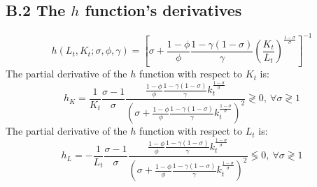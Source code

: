 \subsection*{B.2 The $h$ function's derivatives}

\begin{equation*}
	h(L_t, K_t; \sigma, \phi, \gamma) = \left[ \sigma + \frac{1-\phi}{\phi} \frac{1-\gamma(1-\sigma)}{\gamma} \left(\frac{K_t}{L_t}\right)^{\frac{1-\sigma}{\sigma}} \right]^{-1}
\end{equation*}
The partial derivative of the $h$ function with respect to $K_t$ is:
\begin{equation*}
	h_K = \frac{1}{K_t}\frac{\sigma-1}{\sigma}\frac{\frac{1-\phi}{\phi}\frac{1-\gamma(1-\sigma)}{\gamma}k_t^{\frac{1-\sigma}{\sigma}}}{\left(\sigma + \frac{1-\phi}{\phi}\frac{1-\gamma(1-\sigma)}{\gamma}k_t^{\frac{1-\sigma}{\sigma}}\right)^2} \gtrless 0,~\forall \sigma \gtrless 1
\end{equation*}
The partial derivative of the $h$ function with respect to $L_t$ is:
\begin{equation*}
	h_L = -\frac{1}{L_t}\frac{\sigma-1}{\sigma}\frac{\frac{1-\phi}{\phi}\frac{1-\gamma(1-\sigma)}{\gamma}k_t^{\frac{1-\sigma}{\sigma}}}{\left(\sigma + \frac{1-\phi}{\phi}\frac{1-\gamma(1-\sigma)}{\gamma}k_t^{\frac{1-\sigma}{\sigma}}\right)^2} \lessgtr 0,~\forall \sigma \gtrless 1
\end{equation*}




